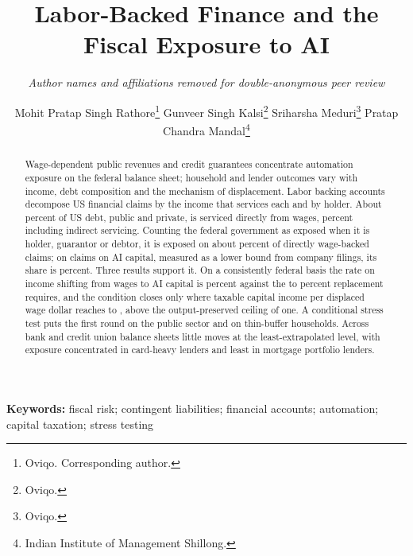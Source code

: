\documentclass[11pt]{article}
\title{\bfseries Labor-Backed Finance and the Fiscal Exposure to AI}
\author{\normalsize\itshape Author names and affiliations removed for double-anonymous peer review}
\author{%
    Mohit Pratap Singh Rathore\thanks{Oviqo. Corresponding author.}\quad
    Gunveer Singh Kalsi\thanks{Oviqo.}\quad
    Sriharsha Meduri\thanks{Oviqo.}\quad
    Pratap Chandra Mandal\thanks{Indian Institute of Management Shillong.}}
\date{}
\theoremstyle{definition}
\begin{document}
\maketitle

\begin{abstract}
\noindent
Wage-dependent public revenues and credit guarantees concentrate automation exposure on the
federal balance sheet; household and lender outcomes vary with income, debt composition and the
mechanism of displacement. Labor backing accounts decompose US financial claims by the income that
services each and by holder. About  percent of US debt, public and
private, is serviced directly from wages,  percent including indirect
servicing. Counting the federal government as exposed when it is holder, guarantor or debtor, it
is exposed on about  percent of directly wage-backed claims; on claims on
AI capital, measured as a lower bound from company filings, its share is
 percent. Three results support it. On a consistently federal
basis the rate on income shifting from wages to AI capital is  percent
against the  to  percent replacement requires, and
the condition closes only where taxable capital income per displaced wage dollar reaches
 to , above the output-preserved ceiling of one. A conditional stress test puts the first round on the public sector and on
thin-buffer households. Across  bank and credit union
balance sheets little moves at the least-extrapolated level, with exposure concentrated in
card-heavy lenders and least in mortgage portfolio lenders.
\end{abstract}

\vspace{0.5em}
\noindent\textbf{Keywords:} fiscal risk; contingent liabilities; financial accounts; automation;
capital taxation; stress testing














\end{document}
